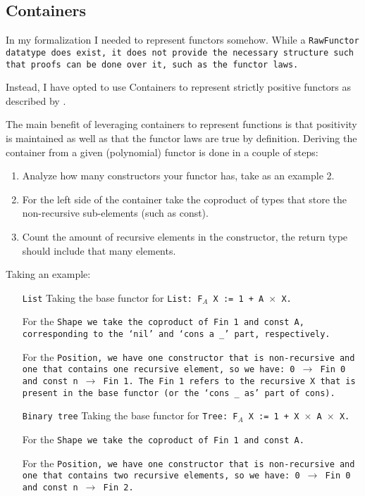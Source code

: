 
\subsection{Containers}
In my formalization I needed to represent functors somehow.
While a \tt{RawFunctor} datatype does exist, it does not provide the necessary structure such that proofs can be done over it, such as the functor laws.

Instead, I have opted to use Containers to represent strictly positive functors as described by \cite{Abbott2005}.


The main benefit of leveraging containers to represent functions is that positivity is maintained as well as that the functor laws are true by definition.
Deriving the container from a given (polynomial) functor is done in a couple of steps:
\begin{enumerate}
    \item Analyze how many constructors your functor has, take as an example 2.
    \item For the left side of the container take the coproduct of types that store the non-recursive sub-elements (such as const).
    \item Count the amount of recursive elements in the constructor, the return type should include that many elements.
\end{enumerate}
Taking an example:
\begin{itemize}
    \item[\tt{List}]
    Taking the base functor for \tt{List}: \tt{F$_A$ X := 1 + A $\times$ X}.

    For the \tt{Shape} we take the coproduct of \tt{Fin 1} and \tt{const A}, corresponding to the `\tt{nil}' and `\tt{cons a \_}' part, respectively.

    For the \tt{Position}, we have one constructor that is non-recursive and one that contains one recursive element, so we have:
    \tt{0 $\to$ Fin 0} and \tt{const n $\to$ Fin 1}.
    The Fin 1 refers to the recursive X that is present in the base functor (or the `\tt{cons \_ as}' part of cons).
    \item[\tt{Binary tree}]
    Taking the base functor for \tt{Tree}: \tt{F$_A$ X := 1 + X $\times$ A $\times$ X}.

    For the \tt{Shape} we take the coproduct of \tt{Fin 1} and \tt{const A}.

    For the \tt{Position}, we have one constructor that is non-recursive and one that contains two recursive elements, so we have:
    \tt{0 $\to$ Fin 0} and \tt{const n $\to$ Fin 2}.
\end{itemize}
